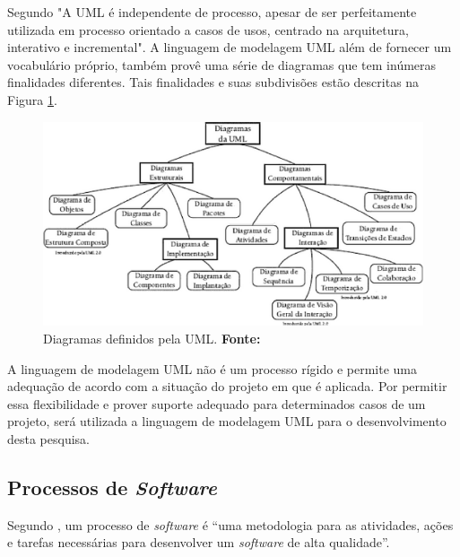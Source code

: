 			\par Segundo  "A
		 UML é independente de processo, apesar de ser perfeitamente utilizada em
		 processo orientado a casos de usos, centrado na arquitetura, interativo e
		 incremental". A linguagem de modelagem UML além de fornecer um vocabulário
		 próprio, também provê uma série de diagramas que tem inúmeras finalidades
		 diferentes. Tais finalidades e suas subdivisões estão descritas na Figura
		 \ref{fig:qt4}.
				
		\begin{figure}[h!]
			\centerline{\includegraphics[scale=0.8]{./imagens/1_q_teorico/qt4.png}}
				\caption[Principais Diagramas definidos pela UML.]{Diagramas definidos pela
				UML. \textbf{Fonte:}}
				\label{fig:qt4}
		\end{figure}
		
		\pagebreak
		\par A linguagem de modelagem UML não é um processo rígido e permite uma
		adequação de acordo com a situação do projeto em que é aplicada. Por permitir
		essa flexibilidade e prover suporte adequado para determinados casos de um
		projeto, será utilizada a linguagem de modelagem UML  para o desenvolvimento
		desta pesquisa.

	
	\subsection{Processos de \textit{Software}}
	
	
	\par Segundo , um processo de \textit{software} é
“uma metodologia para as atividades, ações e tarefas necessárias para
desenvolver um \textit{software} de alta qualidade”.

